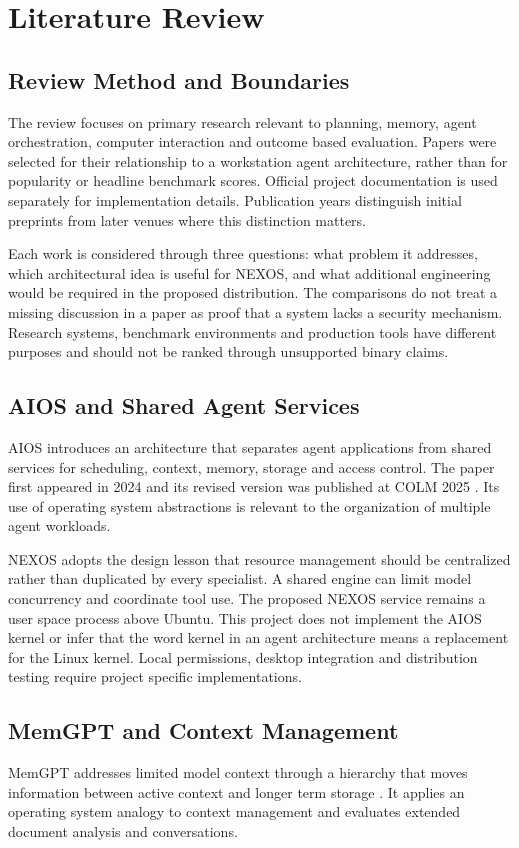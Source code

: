 \chapter{Literature Review}
\section{Review Method and Boundaries}
The review focuses on primary research relevant to planning, memory, agent orchestration, computer interaction and outcome based evaluation. Papers were selected for their relationship to a workstation agent architecture, rather than for popularity or headline benchmark scores. Official project documentation is used separately for implementation details. Publication years distinguish initial preprints from later venues where this distinction matters.

Each work is considered through three questions: what problem it addresses, which architectural idea is useful for NEXOS, and what additional engineering would be required in the proposed distribution. The comparisons do not treat a missing discussion in a paper as proof that a system lacks a security mechanism. Research systems, benchmark environments and production tools have different purposes and should not be ranked through unsupported binary claims.

\section{AIOS and Shared Agent Services}
AIOS introduces an architecture that separates agent applications from shared services for scheduling, context, memory, storage and access control. The paper first appeared in 2024 and its revised version was published at COLM 2025 \cite{aios}. Its use of operating system abstractions is relevant to the organization of multiple agent workloads.

NEXOS adopts the design lesson that resource management should be centralized rather than duplicated by every specialist. A shared engine can limit model concurrency and coordinate tool use. The proposed NEXOS service remains a user space process above Ubuntu. This project does not implement the AIOS kernel or infer that the word kernel in an agent architecture means a replacement for the Linux kernel. Local permissions, desktop integration and distribution testing require project specific implementations.

\section{MemGPT and Context Management}
MemGPT addresses limited model context through a hierarchy that moves information between active context and longer term storage \cite{memgpt}. It applies an operating system analogy to context management and evaluates extended document analysis and conversations.

